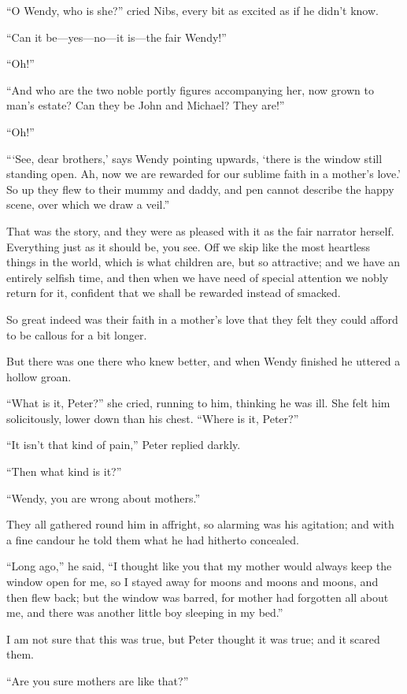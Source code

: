 ``O Wendy, who is she?'' cried Nibs, every bit as excited as if he didn't
know.

``Can it be---yes—no—it is—the fair Wendy!''

``Oh!''

``And who are the two noble portly figures accompanying her, now grown
to man's estate? Can they be John and Michael? They are!''

``Oh!''

``‘See, dear brothers,' says Wendy pointing upwards, ‘there is the
window still standing open. Ah, now we are rewarded for our sublime
faith in a mother's love.' So up they flew to their mummy and daddy,
and pen cannot describe the happy scene, over which we draw a veil.''

That was the story, and they were as pleased with it as the fair
narrator herself. Everything just as it should be, you see. Off we skip
like the most heartless things in the world, which is what children
are, but so attractive; and we have an entirely selfish time, and then
when we have need of special attention we nobly return for it,
confident that we shall be rewarded instead of smacked.

So great indeed was their faith in a mother's love that they felt they
could afford to be callous for a bit longer.

But there was one there who knew better, and when Wendy finished he
uttered a hollow groan.

``What is it, Peter?'' she cried, running to him, thinking he was ill.
She felt him solicitously, lower down than his chest. ``Where is it,
Peter?''

``It isn't that kind of pain,'' Peter replied darkly.

``Then what kind is it?''

``Wendy, you are wrong about mothers.''

They all gathered round him in affright, so alarming was his agitation;
and with a fine candour he told them what he had hitherto concealed.

``Long ago,'' he said, ``I thought like you that my mother would always
keep the window open for me, so I stayed away for moons and moons and
moons, and then flew back; but the window was barred, for mother had
forgotten all about me, and there was another little boy sleeping in my
bed.''

I am not sure that this was true, but Peter thought it was true; and it
scared them.

``Are you sure mothers are like that?''

